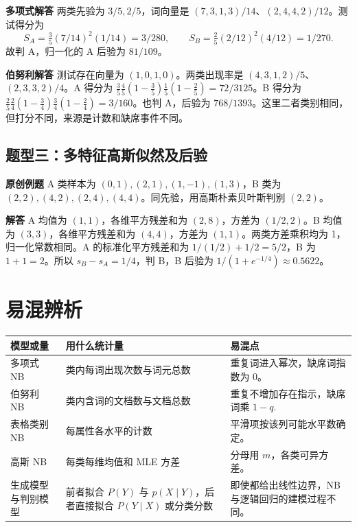 \documentclass[UTF8,a4paper,zihao=-4,fontset=fandol]{ctexrep}
\begin{document}
\textbf{多项式解答} 两类先验为 $3/5,2/5$，词向量是 $(7,3,1,3)/14$、$(2,4,4,2)/12$。测试得分为
\[
 S_A=\tfrac35(7/14)^2(1/14)=3/280,\qquad
 S_B=\tfrac25(2/12)^2(4/12)=1/270.
\]
故判 A，归一化的 A 后验为 $81/109$。

\textbf{伯努利解答} 测试存在向量为 $(1,0,1,0)$。两类出现率是 $(4,3,1,2)/5$、$(2,3,3,2)/4$。A 得分为 $\frac35\frac45(1-\frac35)\frac15(1-\frac25)=72/3125$。B 得分为 $\frac25\frac24(1-\frac34)\frac34(1-\frac24)=3/160$。也判 A，后验为 $768/1393$。这里二者类别相同，但打分不同，来源是计数和缺席事件不同。

\subsection*{题型三：多特征高斯似然及后验}
\textbf{原创例题} A 类样本为 $(0,1),(2,1),(1,-1),(1,3)$，B 类为 $(2,2),(4,2),(2,4),(4,4)$。同先验，用高斯朴素贝叶斯判别 $(2,2)$。

\textbf{解答} A 均值为 $(1,1)$，各维平方残差和为 $(2,8)$，方差为 $(1/2,2)$。B 均值为 $(3,3)$，各维平方残差和为 $(4,4)$，方差为 $(1,1)$。两类方差乘积均为 1，归一化常数相同。A 的标准化平方残差和为 $1/(1/2)+1/2=5/2$，B 为 $1+1=2$。所以 $s_B-s_A=1/4$，判 B，B 后验为 $1/(1+e^{-1/4})\approx0.5622$。

\section{易混辨析}
\noindent\begin{tabularx}{\linewidth}{@{}l>{\raggedright\arraybackslash}X>{\raggedright\arraybackslash}X@{}}
\toprule
模型或量 & 用什么统计量 & 易混点\\
\midrule
多项式 NB & 类内每词出现次数与词元总数 & 重复词进入幂次，缺席词指数为 0。\\
伯努利 NB & 类内含词的文档数与文档总数 & 重复不增加存在指示，缺席词乘 $1-q$.\\
表格类别 NB & 每属性各水平的计数 & 平滑项按该列可能水平数确定。\\
高斯 NB & 每类每维均值和 MLE 方差 & 分母用 $m$，各类可异方差。\\
生成模型与判别模型 & 前者拟合 $P(Y)$ 与 $p(X\mid Y)$，后者直接拟合 $P(Y\mid X)$ 或分类分数 & 即使都给出线性边界，NB 与逻辑回归的建模过程不同。\\
\bottomrule
\end{tabularx}
\end{document}
